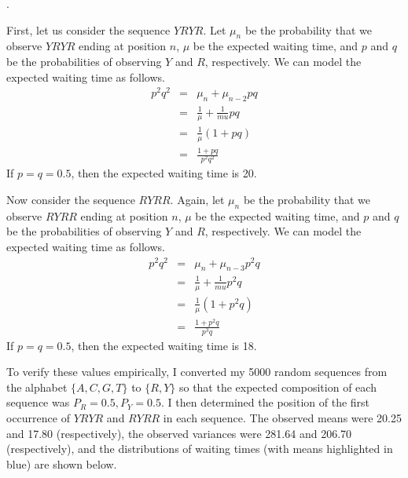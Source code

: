 \documentclass[a4paper, 10pt]{article}
\newcounter{prob_num}
\newcommand{\problem}{\vspace{20pt}\arabic{prob_num}.\stepcounter{prob_num}\par}
\begin{document}
\problem

First, let us consider the sequence $YRYR$. Let $\mu_n$ be the probability that we observe $YRYR$ ending at position $n$, $\mu$ be the expected waiting time, and $p$ and $q$ be the probabilities of observing $Y$ and $R$, respectively. We can model the expected waiting time as follows.
\begin{eqnarray}
  p^{2}q^{2} &=& \mu_{n} + \mu_{n - 2}pq \nonumber \\
             &=& \frac{1}{\mu} + \frac{1}{mu}pq \nonumber \\
             &=& \frac{1}{\mu}(1 + pq) \nonumber \\
             &=& \frac{1 + pq}{p^{2}q^{2}}
\end{eqnarray}
If $p = q = 0.5$, then the expected waiting time is 20.

Now consider the sequence $RYRR$. Again, let $\mu_n$ be the probability that we observe $RYRR$ ending at position $n$, $\mu$ be the expected waiting time, and $p$ and $q$ be the probabilities of observing $Y$ and $R$, respectively. We can model the expected waiting time as follows.
\begin{eqnarray}
  p^{2}q^{2} &=& \mu_{n} + \mu_{n - 3}p^{2}q \nonumber \\
             &=& \frac{1}{\mu} + \frac{1}{mu}p^{2}q \nonumber \\
             &=& \frac{1}{\mu}(1 + p^{2}q) \nonumber \\
             &=& \frac{1 + p^{2}q}{p^{3}q}
\end{eqnarray}
If $p = q = 0.5$, then the expected waiting time is 18.

To verify these values empirically, I converted my 5000 random sequences from the alphabet $\{A, C, G, T\}$ to $\{ R, Y\}$ so that the expected composition of each sequence was $P_R = 0.5, P_Y = 0.5$. I then determined the position of the first occurrence of $YRYR$ and $RYRR$ in each sequence. The observed means were 20.25 and 17.80 (respectively), the observed variances were 281.64 and 206.70 (respectively), and the distributions of waiting times (with means highlighted in blue) are shown below.
\end{document}
